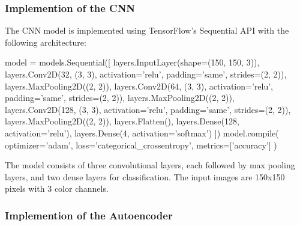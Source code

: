 \subsubsection{Implemention of the CNN}
The CNN model is implemented using TensorFlow's Sequential API with the following architecture:
\vspace{0.3cm}
\begin{python}
model = models.Sequential([
    layers.InputLayer(shape=(150, 150, 3)), 
    layers.Conv2D(32, (3, 3), activation='relu', padding='same', strides=(2, 2)),
    layers.MaxPooling2D((2, 2)),
    layers.Conv2D(64, (3, 3), activation='relu', padding='same', strides=(2, 2)),
    layers.MaxPooling2D((2, 2)),
    layers.Conv2D(128, (3, 3), activation='relu', padding='same', strides=(2, 2)),
    layers.MaxPooling2D((2, 2)),
    layers.Flatten(),
    layers.Dense(128, activation='relu'),
    layers.Dense(4, activation='softmax')
])
model.compile(
    optimizer='adam',
    loss='categorical_crossentropy',
    metrics=['accuracy']
)
\end{python}

The model consists of three convolutional layers, each followed by max pooling layers, and two dense layers for classification. The input images are 150x150 pixels with 3 color channels.
\subsubsection{Implemention of the Autoencoder}

